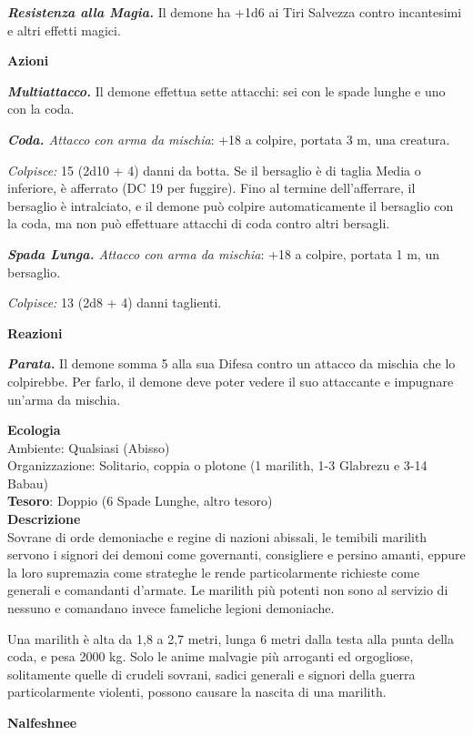 \begin{multicols}{2}
	\textit{\textbf{Resistenza alla Magia.}} Il demone ha +1d6 ai Tiri Salvezza contro incantesimi e altri effetti magici.

	\textbf{Azioni}

	\textit{\textbf{Multiattacco.}} Il demone effettua sette attacchi: sei con le spade lunghe e uno con la coda.

	\textit{\textbf{Coda.} Attacco con arma da mischia}: +18 a colpire, portata 3 m, una creatura.

	\textit{Colpisce:} 15 (2d10 + 4) danni da botta. Se il bersaglio è di taglia Media o inferiore, è afferrato (DC 19 per fuggire). Fino al termine dell'afferrare, il bersaglio è intralciato, e il demone può colpire automaticamente il bersaglio con la coda, ma non può effettuare attacchi di coda contro altri bersagli.

	\textit{\textbf{Spada Lunga.} Attacco con arma da mischia}: +18 a colpire, portata 1 m, un bersaglio.

	\textit{Colpisce:} 13 (2d8 + 4) danni taglienti.

	\textbf{Reazioni}

	\textit{\textbf{Parata.}} Il demone somma 5 alla sua Difesa contro un attacco da mischia che lo colpirebbe. Per farlo, il demone deve poter vedere il suo attaccante e impugnare un'arma da mischia.

	\textbf{Ecologia}\\
	Ambiente: Qualsiasi (Abisso)\\
	Organizzazione: Solitario, coppia o plotone (1 marilith, 1-3 Glabrezu e 3-14 Babau)\\
	\textbf{Tesoro}: Doppio (6 Spade Lunghe, altro tesoro)\\
	\textbf{Descrizione}\\
	Sovrane di orde demoniache e regine di nazioni abissali, le temibili marilith servono i signori dei demoni come governanti, consigliere e persino amanti, eppure la loro supremazia come strateghe le rende particolarmente richieste come generali e comandanti d'armate. Le marilith più potenti non sono al servizio di nessuno e comandano invece fameliche legioni demoniache.

	Una marilith è alta da 1,8 a 2,7 metri, lunga 6 metri dalla testa alla punta della coda, e pesa 2000 kg. Solo le anime malvagie più arroganti ed orgogliose, solitamente quelle di crudeli sovrani, sadici generali e signori della guerra particolarmente violenti, possono causare la nascita di una marilith.

	\medskip{}\textbf{Nalfeshnee}


\end{multicols}
